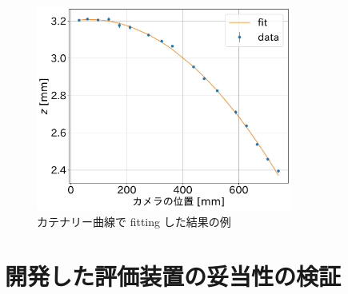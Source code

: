 \documentclass[../../main.tex]{subfiles}
\begin{document}
\begin{figure}[H]
    \centering
    \includegraphics[width=0.75\textwidth]{wiresag/wiresag_catenary.pdf}
    \caption{カテナリー曲線で fitting した結果の例}
    \label{fig:wiresag_catenary}
\end{figure}
\section{開発した評価装置の妥当性の検証}
\end{document}
